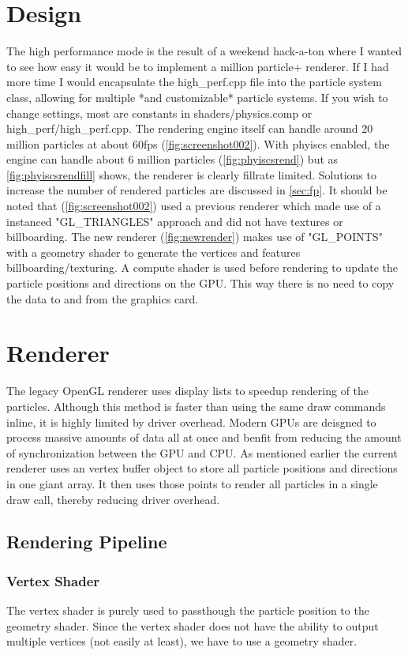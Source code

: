 \documentclass[]{report}
\begin{document}
\section{Design}
The high performance mode is the result of a weekend hack-a-ton where I wanted to see how easy it would be to implement a million particle+ renderer. If I had more time I would encapsulate the high\_perf.cpp file into the particle system class, allowing for multiple *and customizable* particle systems. If you wish to change settings, most are constants in shaders/physics.comp or high\_perf/high\_perf.cpp. The rendering engine itself can handle around 20 million particles at about 60fps (\autoref{fig:screenshot002}). With phyiscs enabled, the engine can handle about 6 million particles (\autoref{fig:phyiscsrend}) but as \autoref{fig:phyiscsrendfill} shows, the renderer is clearly fillrate limited. Solutions to increase the number of rendered particles are discussed in \autoref{sec:fp}. It should be noted that (\autoref{fig:screenshot002}) used a previous renderer which made use of a instanced "GL\_TRIANGLES" approach and did not have textures or billboarding. The new renderer (\autoref{fig:newrender}) makes use of "GL\_POINTS" with a geometry shader to generate the vertices and features billboarding/texturing. A compute shader is used before rendering to update the particle positions and directions on the GPU. This way there is no need to copy the data to and from the graphics card.
\section{Renderer}
The legacy OpenGL renderer uses display lists to speedup rendering of the particles. Although this method is faster than using the same draw commands inline, it is highly limited by driver overhead. Modern GPUs are deisgned to process massive amounts of data all at once and benfit from reducing the amount of synchronization between the GPU and CPU. As mentioned earlier the current renderer uses an vertex buffer object to store all particle positions and directions in one giant array. It then uses those points to render all particles in a single draw call, thereby reducing driver overhead.
\subsection{Rendering Pipeline}
\subsubsection{Vertex Shader}
The vertex shader is purely used to passthough the particle position to the geometry shader. Since the vertex shader does not have the ability to output multiple vertices (not easily at least), we have to use a geometry shader.
\end{document}
